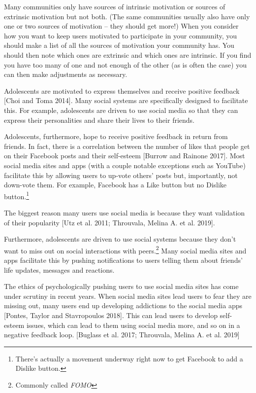 \documentclass[class=book, crop=false]{standalone}
\begin{document}
\begin{mdframed}[style=mystyle,frametitle=Recognizing Sources of Motivation in Your Community]
Many communities only have sources of intrinsic motivation or sources of extrinsic motivation but not both. (The same communities usually also have only one or two sources of motivation -- they should get more!) When you consider how you want to keep users motivated to participate in your community, you should make a list of all the sources of motivation your community has. You should then note which ones are extrinsic and which ones are intrinsic. If you find you have too many of one and not enough of the other (as is often the case) you can then make adjustments as necessary.
\end{mdframed}

Adolescents are motivated to express themselves and receive positive feedback [Choi and Toma 2014]. Many social systems are specifically designed to facilitate this. For example, adolescents are driven to use social media so that they can express their personalities and share their lives to their friends.

Adolescents, furthermore, hope to receive positive feedback in return from friends. In fact, there is a correlation between the number of likes that people get on their Facebook posts and their self-esteem [Burrow and Rainone 2017]. Most social media sites and apps (with a couple notable exceptions such as YouTube) facilitate this by allowing users to up-vote others' posts but, importantly, not down-vote them. For example, Facebook has a Like button but no Dislike button.\footnote{There's actually a movement underway right now to get Facebook to add a Dislike button.}

The biggest reason many users use social media is because they want validation of their popularity [Utz et al. 2011; Throuvala, Melina A. et al. 2019].

Furthermore, adolescents are driven to use social systems because they don't want to miss out on social interactions with peers.\footnote{Commonly called \textit{FOMO}} Many social media sites and apps facilitate this by pushing notifications to users telling them about friends' life updates, messages and reactions.

The ethics of psychologically pushing users to use social media sites has come under scrutiny in recent years. When social media sites lead users to fear they are missing out, many users end up developing addictions to the social media apps [Pontes, Taylor and Stavropoulos 2018]. This can lead users to develop self-esteem issues, which can lead to them using social media more, and so on in a negative feedback loop. [Buglass et al. 2017; Throuvala, Melina A. et al. 2019]
\end{document}
